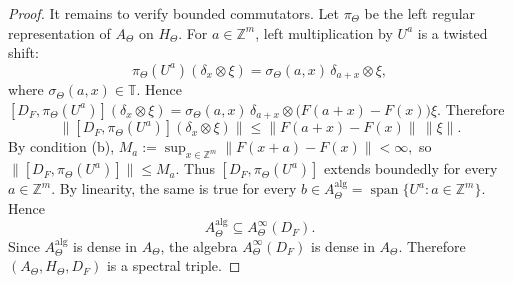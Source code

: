 \documentclass[11pt]{amsart}
\theoremstyle{definition}
\theoremstyle{remark}
\newcommand{\T}{\mathbb{T}}
\newcommand{\Z}{\mathbb{Z}}
\begin{document}
\begin{proof}
It remains to verify bounded commutators. Let $\pi_\Theta$ be the left regular
representation of $A_\Theta$ on $H_\Theta$. For $a\in\Z^m$, left
multiplication by $U^a$ is a twisted shift: \[\pi_\Theta(U^a)(\delta_x\otimes\xi)
=
\sigma_\Theta(a,x)\,\delta_{a+x}\otimes\xi,\] where
$\sigma_\Theta(a,x)\in\T$. Hence $[D_F,\pi_\Theta(U^a)](\delta_x\otimes\xi)
=\sigma_\Theta(a,x)\,\delta_{a+x}\otimes \bigl(F(a+x)-F(x)\bigr)\xi.$
Therefore
\[
\|[D_F,\pi_\Theta(U^a)](\delta_x\otimes\xi)\|
\leq
\|F(a+x)-F(x)\|\,\|\xi\|.
\]
By condition \textup{(b)}, $M_a:=\sup_{x\in\Z^m}\|F(x+a)-F(x)\|<\infty,$
so $\|[D_F,\pi_\Theta(U^a)]\|\leq M_a.$
Thus $[D_F,\pi_\Theta(U^a)]$ extends boundedly for every $a\in\Z^m$. By
linearity, the same is true for every $b\in A_\Theta^{\mathrm{alg}}=\operatorname{span}\{U^a:a\in\Z^m\}.$
Hence
\[
A_\Theta^{\mathrm{alg}}\subseteq A_\Theta^\infty(D_F).
\]
Since $A_\Theta^{\mathrm{alg}}$ is dense in $A_\Theta$, the algebra
$A_\Theta^\infty(D_F)$ is dense in $A_\Theta$. Therefore $(A_\Theta,H_\Theta,D_F)$
is a spectral triple.
\end{proof}
\end{document}
